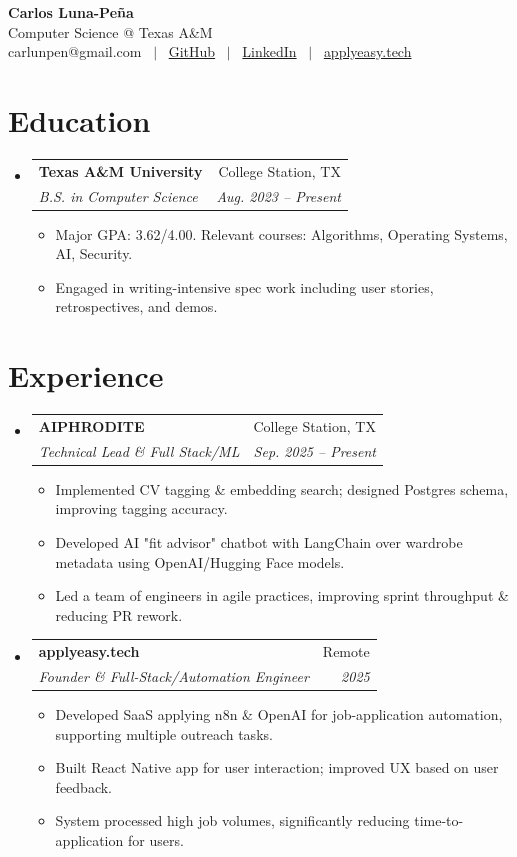 \documentclass[letterpaper,11pt]{article}
\makeatletter
\newcommand{\resumeItem}[1]{
\item\small{{#1 \vspace{-2pt}}}
}
\newcommand{\resumeSubheading}[4]{
\vspace{-2pt}\item
\begin{tabular*}{0.97\textwidth}[t]{l@{\extracolsep{\fill}}r}
\textbf{#1} & #2 \\
\textit{\small#3} & \textit{\small #4} \\
\end{tabular*}\vspace{-7pt}
}
\newcommand{\resumeSubHeadingListStart}{\begin{itemize}[leftmargin=0.15in, label={}]}
\newcommand{\resumeSubHeadingListEnd}{\end{itemize}}
\newcommand{\resumeItemListStart}{\begin{itemize}}
\newcommand{\resumeItemListEnd}{\end{itemize}\vspace{-5pt}}
\makeatother
\begin{document}
\begin{center}
\textbf{\LARGE Carlos Luna-Peña}\\
\vspace{2pt}
Computer Science @ Texas A\&M\\
\vspace{2pt}
carlunpen@gmail.com \ $|$ \ \href{https://github.com/clmoon2}{GitHub} \ $|$ \ \href{https://linkedin.com/in/carlos-luna}{LinkedIn} \ $|$ \ \href{https://applyeasy.tech}{applyeasy.tech}\\
\end{center}

\section{Education}
\resumeSubHeadingListStart
\resumeSubheading
{Texas A\&M University}{College Station, TX}
{B.S. in Computer Science}{Aug. 2023 -- Present}
\resumeItemListStart
\resumeItem{Major GPA: 3.62/4.00. Relevant courses: Algorithms, Operating Systems, AI, Security.}
\resumeItem{Engaged in writing-intensive spec work including user stories, retrospectives, and demos.}
\resumeItemListEnd
\resumeSubHeadingListEnd

\section{Experience}
\resumeSubHeadingListStart
\resumeSubheading
{AIPHRODITE}{College Station, TX}
{Technical Lead \& Full Stack/ML}{Sep. 2025 -- Present}
\resumeItemListStart
\resumeItem{Implemented CV tagging \& embedding search; designed Postgres schema, improving tagging accuracy.}
\resumeItem{Developed AI "fit advisor" chatbot with LangChain over wardrobe metadata using OpenAI/Hugging Face models.}
\resumeItem{Led a team of engineers in agile practices, improving sprint throughput \& reducing PR rework.}
\resumeItemListEnd
\resumeSubheading
{applyeasy.tech}{Remote}
{Founder \& Full-Stack/Automation Engineer}{2025}
\resumeItemListStart
\resumeItem{Developed SaaS applying n8n \& OpenAI for job-application automation, supporting multiple outreach tasks.}
\resumeItem{Built React Native app for user interaction; improved UX based on user feedback.}
\resumeItem{System processed high job volumes, significantly reducing time-to-application for users.}
\resumeItemListEnd
\resumeSubHeadingListEnd
\end{document}
